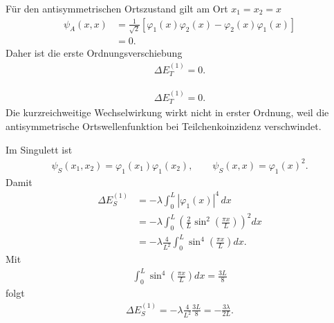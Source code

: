 \documentclass[11pt,a4paper]{scrartcl}
\newcommand{\abs}[1]{\left| #1 \right|}
\begin{document}
\begin{enumerate}[label=(\alph*)]
\begin{calculationbox}
            \begin{calculationbox}[title=Triplett-Ortszustand]
                Für den antisymmetrischen Ortszustand gilt am Ort $x_1=x_2=x$
                \begin{align*}
                    \psi_A(x,x)
                    &=
                    \frac{1}{\sqrt2}
                    \left[
                        \varphi_1(x)\varphi_2(x)
                        -
                        \varphi_2(x)\varphi_1(x)
                    \right]\\
                    &=0.
                \end{align*}
                Daher ist die erste Ordnungsverschiebung
                \begin{align*}
                    \Delta E_T^{(1)}=0.
                \end{align*}

                \begin{solutionbox}[title=Effekt im Triplett]
                    \begin{align*}
                        \Delta E_T^{(1)}=0.
                    \end{align*}
                    Die kurzreichweitige Wechselwirkung wirkt nicht in erster Ordnung, weil die antisymmetrische Ortswellenfunktion bei Teilchenkoinzidenz verschwindet.
                \end{solutionbox}
            \end{calculationbox}

            \begin{calculationbox}[title=Singulett-Ortszustand]
                Im Singulett ist
                \begin{align*}
                    \psi_S(x_1,x_2)=\varphi_1(x_1)\varphi_1(x_2),
                    \qquad
                    \psi_S(x,x)=\varphi_1(x)^2.
                \end{align*}
                Damit
                \begin{align*}
                    \Delta E_S^{(1)}
                    &=-\lambda\int_0^L\abs{\varphi_1(x)}^4\,dx\\
                    &=-\lambda\int_0^L
                    \left(\frac{2}{L}\sin^2\left(\frac{\pi x}{L}\right)\right)^2dx\\
                    &=-\lambda\frac{4}{L^2}\int_0^L\sin^4\left(\frac{\pi x}{L}\right)dx.
                \end{align*}
                Mit
                \begin{align*}
                    \int_0^L\sin^4\left(\frac{\pi x}{L}\right)dx=\frac{3L}{8}
                \end{align*}
                folgt
                \begin{align*}
                    \Delta E_S^{(1)}
                    =
                    -\lambda\frac{4}{L^2}\frac{3L}{8}
                    =
                    -\frac{3\lambda}{2L}.
                \end{align*}


\end{calculationbox}
\end{calculationbox}
\end{enumerate}
\end{document}
